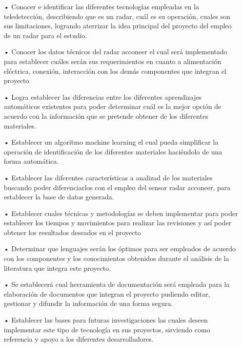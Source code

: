 \begin{itemize}
\item[•] Conocer e identificar las diferentes tecnologías empleadas en la teledetección, describiendo que es un radar, cuál es su operación, cuales son sus limitaciones, logrando aterrizar la idea principal del proyecto del empleo de un radar para el estudio.

\item[•] Conocer los datos técnicos del radar acconeer el cual será implementado para establecer cuáles serán sus requerimientos en cuanto a alimentación eléctrica, conexión, interacción con los demás componentes que integran el proyecto

\item[•] Logra establecer las diferencias entre los diferentes aprendizajes automáticos existentes para poder determinar cuál es la mejor opción de acuerdo con la información que se pretende obtener de los diferentes materiales.

\item[•] Establecer un algoritmo machine learning el cual pueda simplificar la operación de identificación de los diferentes materiales haciéndolo de una forma automática.

\item[•] Establecer las diferentes características a analizad de los materiales buscando poder diferenciarlos con el empleo del sensor radar acconeer, para establecer la base de datos generada.

\item[•] Establecer cuales técnicas y metodologías se deben implementar para poder establecer los tiempos y movimientos para realizar las revisiones y así poder obtener los resultados deseados en el proyecto

\item[•] Determinar que lenguajes serán los óptimos para ser empleados de acuerdo con los componentes y los conocimientos obtenidos durante el análisis de la literatura que integra este proyecto.

\item[•] Se establecerá cual herramienta de documentación será empleada para la elaboración de documentos que integran el proyecto pudiendo editar, gestionar y difundir la información de una forma segura.

\item[•] Establecer las bases para futuras investigaciones las cuales deseen implementar este tipo de tecnología en sus proyectos, sirviendo como referencia y apoyo a los diferentes desarrolladores.

\end{itemize}